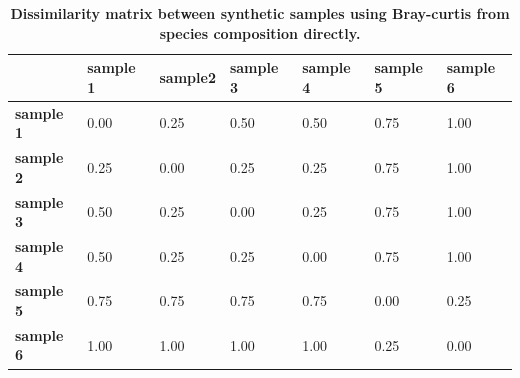 \begin{table}[h]
\begin{tabular}{|l|l|l|l|l|l|l|}
\hline
                  & \textbf{sample 1} & \textbf{sample2} & \textbf{sample 3} & \textbf{sample 4} & \textbf{sample 5} & \textbf{sample 6} \\ \hline
\textbf{sample 1} & 0.00              & 0.25             & 0.50              & 0.50              & 0.75              & 1.00              \\ \hline
\textbf{sample 2} & 0.25              & 0.00             & 0.25              & 0.25              & 0.75              & 1.00              \\ \hline
\textbf{sample 3} & 0.50              & 0.25             & 0.00              & 0.25              & 0.75              & 1.00              \\ \hline
\textbf{sample 4} & 0.50              & 0.25             & 0.25              & 0.00              & 0.75              & 1.00              \\ \hline
\textbf{sample 5} & 0.75              & 0.75             & 0.75              & 0.75              & 0.00              & 0.25              \\ \hline
\textbf{sample 6} & 1.00              & 1.00             & 1.00              & 1.00              & 0.25              & 0.00              \\ \hline
\end{tabular}
\caption{\bf Dissimilarity matrix between synthetic samples using Bray-curtis
from species composition directly. }
\label{table:simulated_real_matrix}
\end{table}

